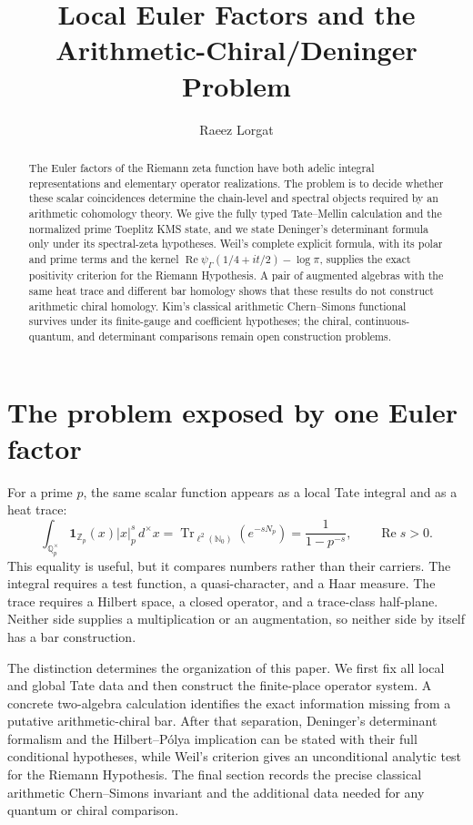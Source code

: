 \documentclass[11pt]{article}
\title{Local Euler Factors and the Arithmetic-Chiral/Deninger Problem}
\author{Raeez Lorgat}
\date{}
\theoremstyle{plain}
\theoremstyle{definition}
\theoremstyle{remark}
\newcommand{\psiGamma}{\psi_{\Gamma}}
\newcommand{\one}{\mathbf 1}
\begin{document}
\maketitle

\begin{abstract}
The Euler factors of the Riemann zeta function have both adelic integral
representations and elementary operator realizations.  The problem is to
decide whether these scalar coincidences determine the chain-level and
spectral objects required by an arithmetic cohomology theory.  We give the
fully typed Tate--Mellin calculation and the normalized prime Toeplitz
KMS state, and we state Deninger's determinant formula only under its
spectral-zeta hypotheses.  Weil's complete explicit formula, with its
polar and prime terms and the kernel
\(\operatorname{Re}\psiGamma(1/4+it/2)-\log\pi\), supplies the exact positivity
criterion for the Riemann Hypothesis.  A pair of augmented algebras with the
same heat trace and different bar homology shows that these results do not
construct arithmetic chiral homology.  Kim's classical arithmetic
Chern--Simons functional survives under its finite-gauge and coefficient
hypotheses; the chiral, continuous-quantum, and determinant comparisons
remain open construction problems.
\end{abstract}

\section{The problem exposed by one Euler factor}

For a prime \(p\), the same scalar function appears as a local Tate integral
and as a heat trace:
\[
 \int_{\mathbb Q_p^\times}\one_{\mathbb Z_p}(x)|x|_p^s\,d^\times x
 =\operatorname{Tr}_{\ell^2(\mathbb N_0)}(e^{-sN_p})
 =\frac{1}{1-p^{-s}},
 \qquad \operatorname{Re}s>0.
\]
This equality is useful, but it compares numbers rather than their carriers.
The integral requires a test function, a quasi-character, and a Haar
measure.  The trace requires a Hilbert space, a closed operator, and a
trace-class half-plane.  Neither side supplies a multiplication or an
augmentation, so neither side by itself has a bar construction.

The distinction determines the organization of this paper.  We first fix
all local and global Tate data and then construct the finite-place operator
system.  A concrete two-algebra calculation identifies the exact information
missing from a putative arithmetic-chiral bar.  After that separation,
Deninger's determinant formalism and the Hilbert--P\'olya implication can be
stated with their full conditional hypotheses, while Weil's criterion gives
an unconditional analytic test for the Riemann Hypothesis.  The final
section records the precise classical arithmetic Chern--Simons invariant and
the additional data needed for any quantum or chiral comparison.
\end{document}
